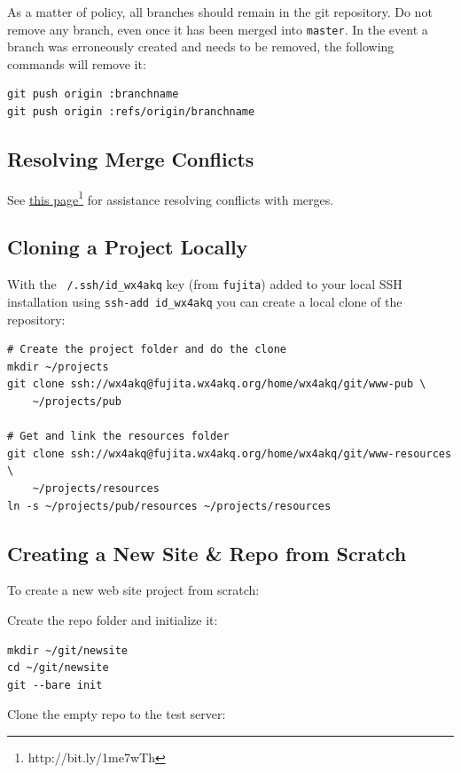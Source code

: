\documentclass[pdflatex,letterpaper,twoside,12pt]{book}
\begin{document}
As a matter of policy, all branches should remain in the git repository.  Do not remove any branch, even once it has been merged into \texttt{master}. In the event a branch was erroneously created and needs to be removed, the following commands will remove it:

\begin{verbatim}
git push origin :branchname
git push origin :refs/origin/branchname
\end{verbatim}

\subsection{Resolving Merge Conflicts}

See \href{http://bit.ly/1me7wTh}{this page}\footnote{http://bit.ly/1me7wTh} for assistance resolving conflicts with merges.

\subsection{Cloning a Project Locally}

With the \texttt{~/.ssh/id\_wx4akq} key (from \texttt{fujita}) added to your local SSH installation using \texttt{ssh-add id\_wx4akq} you can create a local clone of the repository:

\begin{verbatim}
# Create the project folder and do the clone
mkdir ~/projects
git clone ssh://wx4akq@fujita.wx4akq.org/home/wx4akq/git/www-pub \
	~/projects/pub

# Get and link the resources folder
git clone ssh://wx4akq@fujita.wx4akq.org/home/wx4akq/git/www-resources \
	~/projects/resources
ln -s ~/projects/pub/resources ~/projects/resources
\end{verbatim}

\subsection{Creating a New Site \& Repo from Scratch}

To create a new web site project from scratch:

Create the repo folder and initialize it:

\begin{verbatim}
mkdir ~/git/newsite
cd ~/git/newsite
git --bare init
\end{verbatim}

Clone the empty repo to the test server:
\end{document}
